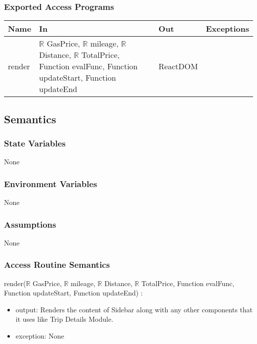 \documentclass[12pt, titlepage]{article}
\begin{document}
\subsubsection{Exported Access Programs}

\begin{tabular}{| l | l | l | l |}
  \hline
  \textbf{Name} & \textbf{In} & \textbf{Out} & \textbf{Exceptions}\\
  \hline
  render & $\mathbb{R}$ GasPrice, $\mathbb{R}$ mileage, $\mathbb{R}$ Distance, $\mathbb{R}$ TotalPrice, Function evalFunc, Function updateStart, Function updateEnd & ReactDOM & ~\\
  \hline
\end{tabular}

\subsection{Semantics}

\subsubsection{State Variables}

None

\subsubsection{Environment Variables}

None

\subsubsection{Assumptions}

None

\subsubsection{Access Routine Semantics}

\noindent render($\mathbb{R}$ GasPrice, $\mathbb{R}$ mileage, $\mathbb{R}$ Distance, $\mathbb{R}$ TotalPrice, Function evalFunc, Function updateStart, Function updateEnd) :
\begin{itemize}
\item output: Renders the content of Sidebar along with any other components that it uses like Trip Details Module.
\item exception: None
\end{itemize}
\end{document}
